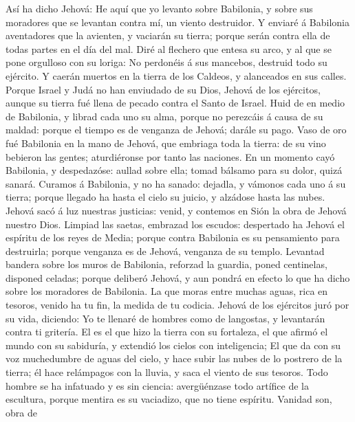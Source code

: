  Así ha dicho Jehová: He aquí que yo levanto sobre
Babilonia, y sobre sus moradores que se levantan contra mí, un viento
destruidor.  Y enviaré á Babilonia aventadores que la
avienten, y vaciarán su tierra; porque serán contra ella de todas partes
en el día del mal.  Diré al flechero que entesa su arco, y
al que se pone orgulloso con su loriga: No perdonéis á sus mancebos,
destruid todo su ejército.  Y caerán muertos en la tierra
de los Caldeos, y alanceados en sus calles.  Porque Israel
y Judá no han enviudado de su Dios, Jehová de los ejércitos, aunque su
tierra fué llena de pecado contra el Santo de Israel. 
Huid de en medio de Babilonia, y librad cada uno su alma, porque no
perezcáis á causa de su maldad: porque el tiempo es de venganza de
Jehová; darále su pago.  Vaso de oro fué Babilonia en la
mano de Jehová, que embriaga toda la tierra: de su vino bebieron las
gentes; aturdiéronse por tanto las naciones.  En un
momento cayó Babilonia, y despedazóse: aullad sobre ella; tomad bálsamo
para su dolor, quizá sanará.  Curamos á Babilonia, y no ha
sanado: dejadla, y vámonos cada uno á su tierra; porque llegado ha hasta
el cielo su juicio, y alzádose hasta las nubes.  Jehová
sacó á luz nuestras justicias: venid, y contemos en Sión la obra de
Jehová nuestro Dios.  Limpiad las saetas, embrazad los
escudos: despertado ha Jehová el espíritu de los reyes de Media; porque
contra Babilonia es su pensamiento para destruirla; porque venganza es
de Jehová, venganza de su templo.  Levantad bandera sobre
los muros de Babilonia, reforzad la guardia, poned centinelas, disponed
celadas; porque deliberó Jehová, y aun pondrá en efecto lo que ha dicho
sobre los moradores de Babilonia.  La que moras entre
muchas aguas, rica en tesoros, venido ha tu fin, la medida de tu
codicia.  Jehová de los ejércitos juró por su vida,
diciendo: Yo te llenaré de hombres como de langostas, y levantarán
contra ti gritería.  El es el que hizo la tierra con su
fortaleza, el que afirmó el mundo con su sabiduría, y extendió los
cielos con inteligencia;  El que da con su voz
muchedumbre de aguas del cielo, y hace subir las nubes de lo postrero de
la tierra; él hace relámpagos con la lluvia, y saca el viento de sus
tesoros.  Todo hombre se ha infatuado y es sin ciencia:
avergüénzase todo artífice de la escultura, porque mentira es su
vaciadizo, que no tiene espíritu.  Vanidad son, obra de
